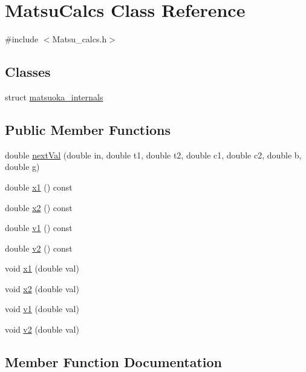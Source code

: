 \hypertarget{classMatsuCalcs}{}\section{Matsu\+Calcs Class Reference}
\label{classMatsuCalcs}


{\ttfamily \#include $<$Matsu\+\_\+calcs.\+h$>$}

\subsection*{Classes}
\begin{DoxyCompactItemize}
\item 
struct \hyperlink{structMatsuCalcs_1_1matsuoka__internals}{matsuoka\+\_\+internals}
\end{DoxyCompactItemize}
\subsection*{Public Member Functions}
\begin{DoxyCompactItemize}
\item 
double \hyperlink{classMatsuCalcs_a4721b4e3d438299fa8467aa9ae95e2b7}{next\+Val} (double in, double t1, double t2, double c1, double c2, double b, double g)
\item 
double \hyperlink{classMatsuCalcs_a66d4287c08d622d2ac39292278b2908c}{x1} () const 
\item 
double \hyperlink{classMatsuCalcs_aec566a20e90c3153aa00f7d5fc10ad2b}{x2} () const 
\item 
double \hyperlink{classMatsuCalcs_a2b3307fc79ba82ac145a01b514feb410}{v1} () const 
\item 
double \hyperlink{classMatsuCalcs_a7158e30505b30cce3df2a09d45a5487d}{v2} () const 
\item 
void \hyperlink{classMatsuCalcs_a4b5c02fd37cd1f400c7281b4a0a54c3d}{x1} (double val)
\item 
void \hyperlink{classMatsuCalcs_a7a8ad3e345dcb149244c7d1d84e9912c}{x2} (double val)
\item 
void \hyperlink{classMatsuCalcs_a09616bb8736d0de547f77cde66cb0050}{v1} (double val)
\item 
void \hyperlink{classMatsuCalcs_aafa56580a42b21f3b15c0170d9b2f2a6}{v2} (double val)
\end{DoxyCompactItemize}


\subsection{Member Function Documentation}
